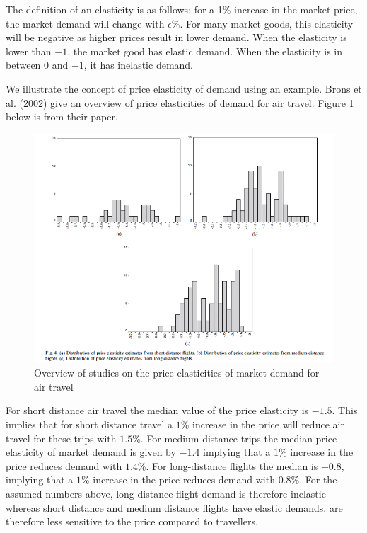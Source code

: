 \documentclass[
]{book}
\begin{document}
The definition of an elasticity is as follows: for a 1\% increase in the market price, the market demand will change with \(\epsilon\)\%. For many market goods, this elasticity will be negative as higher prices result in lower demand. When the elasticity is lower than \(-1\), the market good has elastic demand. When the elasticity is in between 0 and \(-1\), it has inelastic demand.

We illustrate the concept of price elasticity of demand using an example. Brons et al. (2002) give an overview of price elasticities of demand for air travel. Figure \ref{fig:brons} below is from their paper.

\begin{figure}

{\centering \includegraphics[width=600px]{./figures/brons} 

}

\caption{Overview of studies on the price elasticities of market demand for air travel}\label{fig:brons}
\end{figure}

For short distance air travel the median value of the price elasticity is \(-1.5\). This implies that for short distance travel a \(1\)\% increase in the price will reduce air travel for these trips with \(1.5\)\%. For medium-distance trips the median price elasticity of market demand is given by \(-1.4\) implying that a \(1\)\% increase in the price reduces demand with \(1.4\)\%. For long-distance flights the median is \(-0.8\), implying that a \(1\)\% increase in the price reduces demand with \(0.8\)\%. For the assumed numbers above, long-distance flight demand is therefore inelastic whereas short distance and medium distance flights have elastic demands. are therefore less sensitive to the price compared to travellers.
\end{document}
